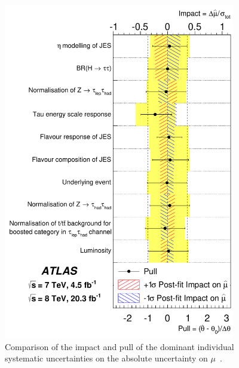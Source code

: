 \clearpage

\begin{figure}[tp]
  \centering
  \includegraphics[width=0.90\textwidth]{figures/HIGG-2013-32/fig_07}
  \caption{Comparison of the impact and pull of the dominant individual systematic uncertainties on the absolute uncertainty on $\mu$~\cite{HIGG-2013-32}.}
  \label{fig:results-uncertainties-2}
\end{figure}

\clearpage

